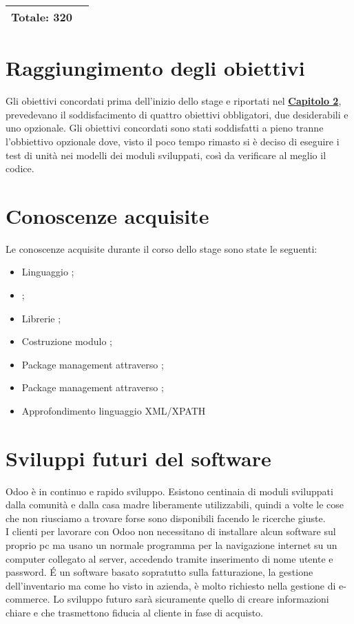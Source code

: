 \begin{center}
\begin{tabular}{|l|l|c l|}
		\hline
		
		\multicolumn{2}{|l|}{\textbf{Totale: 320}} & \multicolumn{2}{l|}{}\\
		\hline
		
	\end{tabular}
	\label{tab:consuntivo_finale}  
\end{center}
\section{Raggiungimento degli obiettivi}
Gli obiettivi concordati prima dell'inizio dello stage e riportati nel \hyperlink{(chap:capitolo2)}{\textbf{Capitolo 2}}, prevedevano il soddisfacimento di quattro obiettivi obbligatori, due desiderabili e uno opzionale.
Gli obiettivi concordati sono stati soddisfatti a pieno tranne l'obbiettivo opzionale dove, visto il poco tempo rimasto si è deciso di eseguire i test di unità nei modelli dei moduli sviluppati, così da verificare al meglio il codice.\\
\newpage
\section{Conoscenze acquisite}
Le conoscenze acquisite durante il corso dello stage sono state le seguenti:
\begin{itemize}
	\item Linguaggio ;
	\item {};
	\item Librerie ;
	\item Costruzione modulo ;
	\item Package management attraverso ;
	\item Package management attraverso ;
	\item Approfondimento linguaggio XML/XPATH

\end{itemize}


\section{Sviluppi futuri del software}
Odoo è in continuo e rapido sviluppo. Esistono centinaia di moduli sviluppati dalla comunità e dalla casa madre liberamente utilizzabili, quindi a volte le cose che non riusciamo a trovare forse sono disponibili facendo le ricerche giuste. \\
I clienti per lavorare con Odoo non necessitano
di installare alcun software sul proprio pc ma usano un normale
programma per la navigazione internet su un computer collegato al
server, accedendo tramite inserimento di nome utente e password.
\'E un software basato sopratutto sulla fatturazione, la gestione dell'inventario ma come ho visto in azienda, è molto richiesto nella gestione di e-commerce. Lo sviluppo futuro sarà sicuramente quello di creare informazioni chiare e che trasmettono fiducia al cliente in fase di acquisto.


